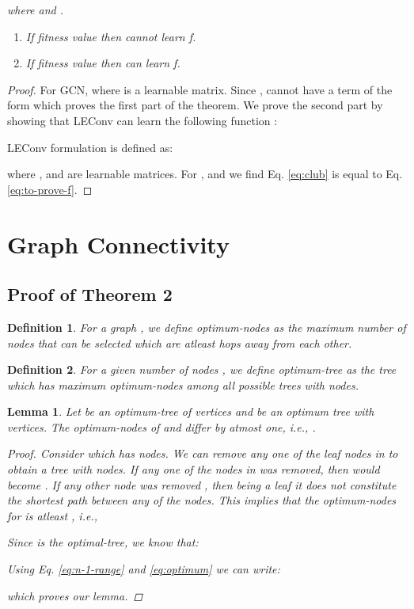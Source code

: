 \documentclass[letterpaper]{article} \usepackage{aaai20}  \usepackage{times}  \usepackage{helvet} \usepackage{courier}  \usepackage[hyphens]{url}  \usepackage{graphicx} \urlstyle{rm} \def\UrlFont{\rm}  \usepackage{graphicx}  \frenchspacing  \setlength{\pdfpagewidth}{8.5in}  \setlength{\pdfpageheight}{11in}
\newtheorem{definition}{Definition}
\newtheorem{lemma}{Lemma}
\begin{document}
	\textit{
		where  and .
	}
	\begin{enumerate}[label=\alph*)]
		\item \textit{If fitness value  then  cannot learn f.}
		\item \textit{If fitness value  then  can learn f.}
	\end{enumerate}
	
	\begin{proof}
		For GCN,  where  is a learnable matrix. Since ,  cannot have a term of the form  which proves the first part of the theorem. We prove the second part by showing that LEConv can learn the following function : 
		
		LEConv formulation is defined as:

		where ,  and  are learnable matrices. For ,  and   we find Eq. \eqref{eq:club} is equal to Eq. \eqref{eq:to-prove-f}.
	\end{proof}
	
	
	
	
	
	\section{Graph Connectivity}
	\subsection{\Large Proof of Theorem 2}
	\label{ssec:graph-connect-proof}
	
	\begin{definition}
		For a graph , we define optimum-nodes  as the maximum number of nodes that can be selected which are atleast  hops away from each other.
	\end{definition}
	
	\begin{definition}
		For a given number of nodes , we define optimum-tree  as the tree which has maximum optimum-nodes  among all possible trees  with  nodes.
	\end{definition}
	
	
\begin{lemma}
		\label{lem:atmost-one}
		Let  be an optimum-tree of  vertices and  be an optimum tree with  vertices. The optimum-nodes of  and  differ by atmost one, i.e., .
		\begin{proof}
Consider  which has  nodes.
			We can remove any one of the leaf nodes in  to obtain a tree  with  nodes. 
			If any one of the nodes in  
			was removed, then  would become 
			. If any other node was removed , then being a leaf it does not constitute the shortest path between any of the  nodes. This implies that the optimum-nodes for  is atleast , i.e.,
			
			Since  is the optimal-tree, we know that:
			
			Using Eq. \eqref{eq:n-1-range} and \eqref{eq:optimum}
			we can write:
			
which proves our lemma.
		\end{proof}
	\end{lemma}
	
\end{document}
